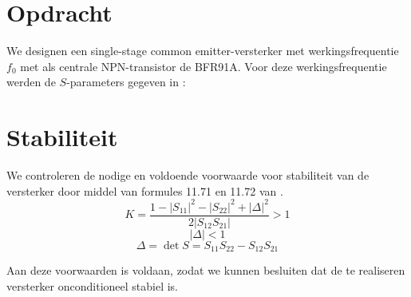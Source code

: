 \section{Opdracht}
    We designen een single-stage common emitter-versterker met werkingsfrequentie $f_0$
    met als centrale NPN-transistor de BFR91A. Voor deze werkingsfrequentie werden
    de $S$-parameters gegeven in \cite{lesWendy}: 
    
    
\section{Stabiliteit}
  
    We controleren de nodige en voldoende voorwaarde voor stabiliteit van de versterker door middel van formules 11.71 en 11.72 van \cite{Pozar}.
    \[
      K = \frac{1 - \left| S_{11} \right|^2 - \left| S_{22} \right|^2 + \left| \Delta \right|^2}{2 \left| S_{12}S_{21} \right|} > 1
    \]
    \[
      \left| \Delta \right| < 1
    \]
    \[
      \Delta = \det{S} = S_{11}S_{22} - S_{12}S_{21}
    \]
    
    Aan deze voorwaarden is voldaan, zodat we kunnen besluiten dat de te realiseren versterker onconditioneel stabiel is.

